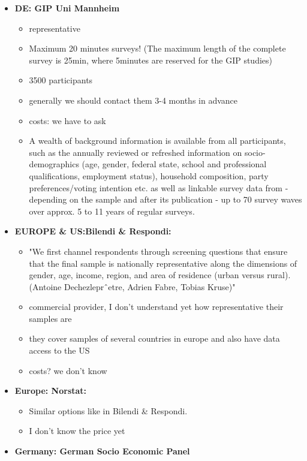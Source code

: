 \documentclass[a4paper, 12pt]{article}
\begin{document}
\begin{itemize}
\begin{itemize}
    \end{itemize}
    \item \textbf{DE: GIP Uni Mannheim}
    \begin{itemize}
        \item representative
        \item Maximum 20 minutes surveys! (The maximum length of the complete survey is 25min, where 5minutes are reserved for the GIP studies)
        \item 3500 participants
        \item generally we should contact them 3-4 months in advance
        \item costs: we have to ask
        \item A wealth of background information is available from all participants, such as the annually reviewed or refreshed information on socio-demographics (age, gender, federal state, school and professional qualifications, employment status), household composition, party preferences/voting intention etc. as well as linkable survey data from - depending on the sample and after its publication - up to 70 survey waves over approx. 5 to 11 years of regular surveys.
    \end{itemize}
    \item \textbf{EUROPE \& US:Bilendi \& Respondi:}
    \begin{itemize}
        \item "We first channel respondents through screening questions that ensure that the final sample is nationally representative along the dimensions of gender, age, income, region, and area of residence (urban versus rural). (Antoine Dechezleprˆetre, Adrien Fabre, Tobias Kruse)"
        \item commercial provider, I don't understand yet how representative their samples are
        \item they cover samples of several countries in europe and also have data access to the US  
        \item costs? we don't know
    \end{itemize}
    \item \textbf{Europe: Norstat:} 
    \begin{itemize}
        \item Similar options like in Bilendi \& Respondi.
        \item I don't know the price yet
    \end{itemize}
    \item \textbf{Germany: German Socio Economic Panel}

\end{itemize}
\end{document}
